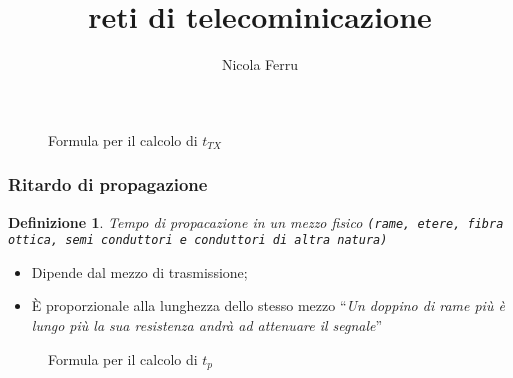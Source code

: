 \documentclass{book}
\title{reti di telecominicazione}
\author{Nicola Ferru}
\newtheorem{defi}{Definizione}[section]
\begin{document}

\tableofcontents

\begin{figure}[!ht]
  \centering
  
  \caption{Formula per il calcolo di $t_{TX}$}
  \label{fig:tTXfm}
\end{figure}

\subsubsection{Ritardo di propagazione}
\label{sec:Ritardodipropagazione}
\begin{defi}
  Tempo di propacazione in un mezzo fisico {\tt (rame, etere, fibra ottica, semi conduttori e conduttori di
    altra natura)}
\end{defi}
\begin{itemize}
\item Dipende dal mezzo di trasmissione;
\item È proporzionale alla lunghezza dello stesso mezzo ``{\it Un doppino di rame più è lungo più la sua
  resistenza andrà ad attenuare il segnale}''
\end{itemize}
\begin{figure}[!ht]
  \centering
  
  \caption{Formula per il calcolo di $t_{p}$}
  \label{fig:tpfm}
\end{figure}
\end{document}

